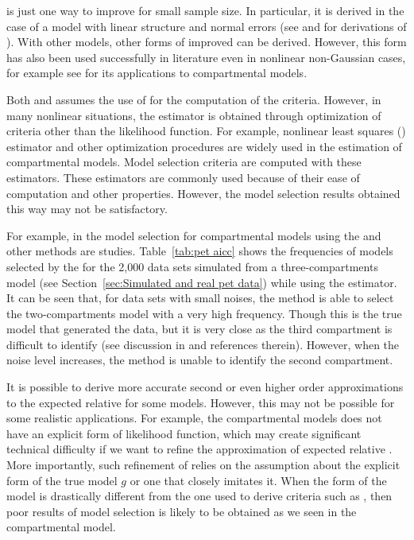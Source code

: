 \aicc is just one way to improve \aic for small sample size. In particular, it
is derived in the case of a model with linear structure and normal errors (see
\cite{Hurvich:1989ev} and \cite[][sec.~6.4.1]{Burnham:2002wc} for derivations
of \aicc). With other models, other forms of improved \aic can be derived.
However, this form has also been used successfully in literature even in
nonlinear non-Gaussian cases, for example see \cite{Turkheimer:2003iy} for its
applications to \pet compartmental models.

Both \aic and \aicc assumes the use of \mle for the computation of the
criteria. However, in many nonlinear situations, the estimator is obtained
through optimization of criteria other than the likelihood function. For
example, nonlinear least squares (\nls) estimator and other optimization
procedures are widely used in the estimation of \pet compartmental models.
Model selection criteria are computed with these estimators. These estimators
are commonly used because of their ease of computation and other properties.
However, the model selection results obtained this way may not be
satisfactory.



For example, in \cite{Zhou2013} the model selection for \pet compartmental
models using the \aic and other methods are studies. Table~\ref{tab:pet aicc}
shows the frequencies of models selected by the \aicc for the 2,000 data sets
simulated from a three-compartments model (see Section~\ref{sec:Simulated and
  real pet data}) while using the \nls estimator. It can be seen that, for
data sets with small noises, the \aicc method is able to select the
two-compartments model with a very high frequency. Though this is the true
model that generated the data, but it is very close as the third compartment
is difficult to identify (see discussion in \cite{Zhou2013} and references
therein). However, when the noise level increases, the method is unable to
identify the second compartment.

It is possible to derive more accurate second or even higher order
approximations to the expected relative \kld for some models. However, this
may not be possible for some realistic applications. For example, the \pet
compartmental models does not have an explicit form of likelihood function,
which may create significant technical difficulty if we want to refine the
\aic approximation of expected relative \kld. More importantly, such
refinement of \aic relies on the assumption about the explicit form of the
true model $g$ or one that closely imitates it. When the form of the model is
drastically different from the one used to derive criteria such as \aicc, then
poor results of model selection is likely to be obtained as we seen in the
\pet compartmental model.

